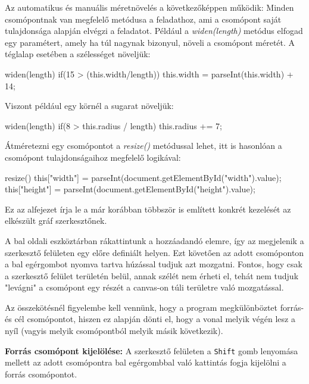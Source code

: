 Az automatikus és manuális méretnövelés a következőképpen működik: Minden csomópontnak van megfelelő metódusa a feladathoz, ami a csomópont saját tulajdonsága alapján elvégzi a feladatot. Például a \textit{widen(length)} metódus elfogad egy paramétert, amely ha túl nagynak bizonyul, növeli a csomópont méretét. A téglalap esetében a szélességet növeljük:

\begin{javascript}
widen(length){
   if(15 > (this.width/length))
   {
       this.width = parseInt(this.width) + 14;
   }
}
\end{javascript}

Viszont például egy körnél a sugarat növeljük:

\begin{javascript}
widen(length){
   if(8 > this.radius / length)
   {
       this.radius += 7;
   }
}
\end{javascript}

Átméretezni egy csomópontot a \textit{resize()} metódussal lehet, itt is hasonlóan a csomópont tulajdonságaihoz megfelelő logikával:

\begin{javascript}
resize(){
   this["width"] = parseInt(document.getElementById("width").value);
   this["height"] =  parseInt(document.getElementById("height").value);
}
\end{javascript}

Ez az alfejezet írja le a már korábban többször is említett konkrét kezelését az elkészült gráf szerkesztőnek.


A bal oldali eszköztárban rákattintunk a hozzáadandó elemre, így az megjelenik a szerkesztő felületen egy előre definiált helyen. Ezt követően az adott csomóponton a bal egérgombot nyomva tartva húzással tudjuk azt mozgatni. Fontos, hogy csak a szerkesztő felület területén belül, annak szélét nem érheti el, tehát nem tudjuk "levágni" a csomópont egy részét a canvas-on túli területre való mozgatással.


Az összekötésnél figyelembe kell vennünk, hogy a program megkülönböztet forrás- és cél csomópontot, hiszen ez alapján dönti el, hogy a vonal melyik végén lesz a nyíl (vagyis melyik csomópontból melyik másik következik).

\textbf{Forrás csomópont kijelölése:} A szerkesztő felületen a \texttt{Shift} gomb lenyomása mellett az adott csomópontra bal egérgombbal való kattintás fogja kijelölni a forrás csomópontot.

